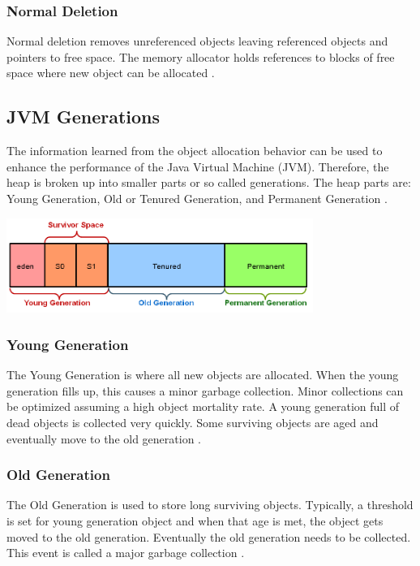 \documentclass[11pt,a4paper]{article}
\begin{document}
\subsubsection*{Normal Deletion}
Normal deletion removes unreferenced objects leaving referenced objects and pointers to free space. The memory allocator holds references to blocks of free space where new object can be allocated \cite{ORACLE_GC_BASICS}.

\subsection{JVM Generations}
The information learned from the object allocation behavior can be used to enhance the performance of the Java Virtual Machine (JVM). Therefore, the heap is broken up into smaller parts or so called generations. The heap parts are: Young Generation, Old or Tenured Generation, and Permanent Generation \cite{ORACLE_GENERATIONS}.

\begin{center}
    \includegraphics[width=0.75\textwidth]{Slide5.PNG}
\end{center}
\subsubsection*{Young Generation}
The Young Generation is where all new objects are allocated. When the young generation fills up, this causes a minor garbage collection. Minor collections can be optimized assuming a high object mortality rate. A young generation full of dead objects is collected very quickly. Some surviving objects are aged and eventually move to the old generation \cite{ORACLE_GC_BASICS}.

\subsubsection*{Old Generation}
The Old Generation is used to store long surviving objects. Typically, a threshold is set for young generation object and when that age is met, the object gets moved to the old generation. Eventually the old generation needs to be collected. This event is called a major garbage collection \cite{ORACLE_GC_BASICS}.
\end{document}
